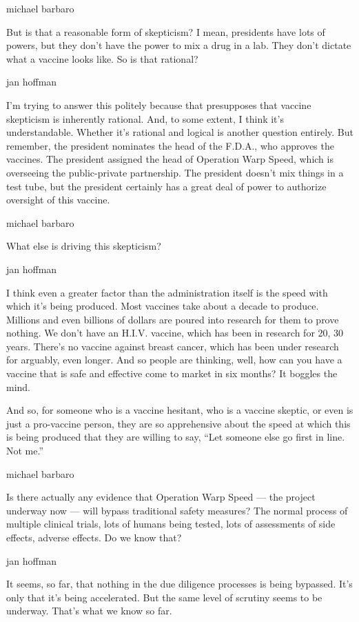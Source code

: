 michael barbaro

But is that a reasonable form of skepticism? I mean, presidents have
lots of powers, but they don't have the power to mix a drug in a lab.
They don't dictate what a vaccine looks like. So is that rational?

jan hoffman

I'm trying to answer this politely because that presupposes that vaccine
skepticism is inherently rational. And, to some extent, I think it's
understandable. Whether it's rational and logical is another question
entirely. But remember, the president nominates the head of the F.D.A.,
who approves the vaccines. The president assigned the head of Operation
Warp Speed, which is overseeing the public-private partnership. The
president doesn't mix things in a test tube, but the president certainly
has a great deal of power to authorize oversight of this vaccine.

michael barbaro

What else is driving this skepticism?

jan hoffman

I think even a greater factor than the administration itself is the
speed with which it's being produced. Most vaccines take about a decade
to produce. Millions and even billions of dollars are poured into
research for them to prove nothing. We don't have an H.I.V. vaccine,
which has been in research for 20, 30 years. There's no vaccine against
breast cancer, which has been under research for arguably, even longer.
And so people are thinking, well, how can you have a vaccine that is
safe and effective come to market in six months? It boggles the mind.

And so, for someone who is a vaccine hesitant, who is a vaccine skeptic,
or even is just a pro-vaccine person, they are so apprehensive about the
speed at which this is being produced that they are willing to say,
``Let someone else go first in line. Not me.''

michael barbaro

Is there actually any evidence that Operation Warp Speed --- the project
underway now --- will bypass traditional safety measures? The normal
process of multiple clinical trials, lots of humans being tested, lots
of assessments of side effects, adverse effects. Do we know that?

jan hoffman

It seems, so far, that nothing in the due diligence processes is being
bypassed. It's only that it's being accelerated. But the same level of
scrutiny seems to be underway. That's what we know so far.

